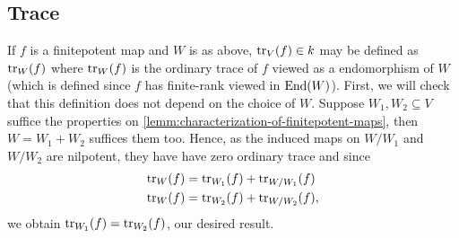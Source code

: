 \subsection*{Trace}
If $f$ is a finitepotent map and $W$ is as above, $\operatorname{tr}_{V}(f)\in k$ may be defined as $\operatorname{tr}_{W}(f)$ where $\operatorname{tr}_{W}(f)$ is the ordinary trace of $f$ viewed as a endomorphism of $W$ (which is defined since $f$ has finite-rank viewed in $\operatorname{End}(W)$). First, we will check that this definition does not depend on the choice of $W$. Suppose $W_{1}, W_{2} \subseteq V$ suffice the properties on \cref{lemm:characterization-of-finitepotent-maps}, then $W = W_{1} + W_{2}$ suffices them too. Hence, as the induced maps on $W/W_{1}$ and $W/W_{2}$ are nilpotent, they have have zero ordinary trace and since
\begin{align*}
	\operatorname{tr}_{W}(f) &= \operatorname{tr}_{W_{1}}(f) + \operatorname{tr}_{W/W_{1}}(f) \\
	\operatorname{tr}_{W}(f) &= \operatorname{tr}_{W_{2}}(f) + \operatorname{tr}_{W/W_{2}}(f),
\end{align*}
we obtain $\operatorname{tr}_{W_{1}}(f) = \operatorname{tr}_{W_{2}}(f)$, our desired result. 

